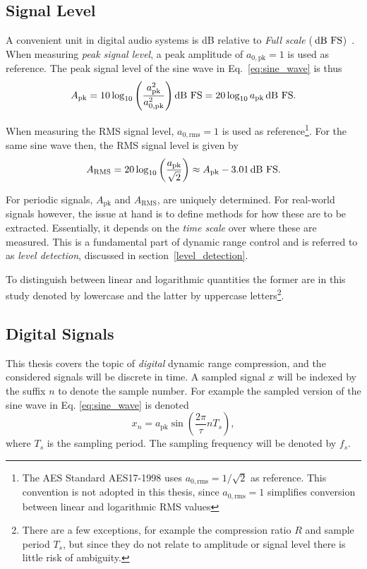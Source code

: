 \documentclass[../main2.tex]{subfiles}
\begin{document}
\subsection{Signal Level}
A convenient unit in digital audio systems is dB relative to \emph{Full scale} ($\mskip3mu\text{dB~FS}$)~\cite{db_fullscale}. When measuring \emph{peak signal level}, a peak amplitude of $a_{0, \text{pk}} = 1$ is used as reference. The peak signal level of the sine wave in Eq.~\eqref{eq:sine_wave} is thus
\begin{equation}
A_\text{pk} = 10 \log_{10} \left( \frac{a_\text{pk}^2}{a_{0, \text{pk}}^2} \right) \text{dB FS} = 20 \log_{10} a_\text{pk} \mskip3mu\text{dB~FS}.
\end{equation}

When measuring the RMS signal level, $a_{0, \text{rms}} = 1$ is used as reference\footnote{The  AES Standard AES17-1998 uses $a_{0, \text{rms}} = 1/\sqrt{2}$ as reference. This convention is not adopted in this thesis, since $a_{0, \text{rms}} = 1$ simplifies conversion between linear and logarithmic RMS values}. For the same sine wave then, the RMS signal level is given by
\begin{equation}
A_\text{RMS} = 20\log_{10} \left( \frac{a_\text{pk}}{\sqrt 2} \right) \approx A_\text{pk}- 3.01 \mskip3mu\text{dB~FS}.
\end{equation}

For periodic signals, $A_\text{pk}$ and $A_\text{RMS}$, are uniquely determined. For real-world signals however, the issue at hand is to define methods for how these are to be extracted. Essentially, it depends on the \emph{time scale} over where these are measured. This is a fundamental part of dynamic range control and is referred to as \emph{level detection}, discussed in section~\ref{level_detection}. 

To distinguish between linear and logarithmic quantities the former are in this study denoted by lowercase and the latter by uppercase letters\footnote{There are a few exceptions, for example the compression ratio $R$ and sample period $T_s$, but since they do not relate to amplitude or signal level there is little risk of ambiguity.}.

\subsection{Digital Signals}
This thesis covers the topic of \emph{digital} dynamic range compression, and the considered signals will be discrete in time. A sampled signal $x$ will be indexed by the suffix $n$ to denote the sample number. For example the sampled version of the sine wave in Eq. \eqref{eq:sine_wave} is denoted
\begin{equation}
x_n = a_\text{pk} \sin \left( \frac{2 \pi}{\tau} n T_s \right),
\end{equation}
where $T_s$ is the sampling period. The sampling frequency will be denoted by $f_s$.
\end{document}
